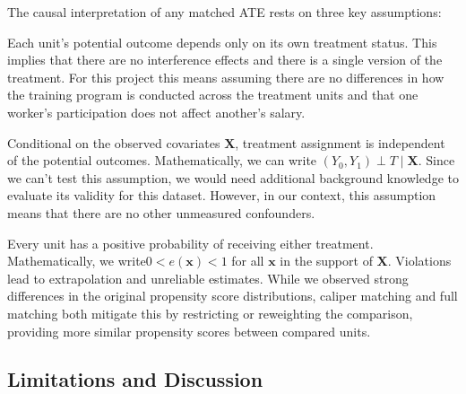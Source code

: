 \documentclass[12pt, a4paper]{article}
\begin{document}
The causal interpretation of any matched ATE rests on three key assumptions:

\begin{description}[leftmargin=2em, style=nextline]
  \item[SUTVA (Stable Unit Treatment Value Assumption)]
    Each unit's potential outcome depends only on its own treatment status. This implies that there are no interference effects and there is a single version of the treatment. For this project this means assuming there are no differences in how the training program is conducted across the treatment units and that one worker's participation does not affect another's salary.
  \item[Ignorability]
    Conditional on the observed covariates $\mathbf{X}$, treatment assignment is independent of the potential outcomes. Mathematically, we can write $(Y_0, Y_1) \perp T \mid \mathbf{X}$. Since we can't test this assumption, we would need additional background knowledge to evaluate its validity for this dataset. However, in our context, this assumption means that there are no other unmeasured confounders.
  \item[Overlap]
    Every unit has a positive probability of receiving either treatment. Mathematically, we write$0 < e(\mathbf{x}) < 1$ for all $\mathbf{x}$ in the support of $\mathbf{X}$. Violations lead to extrapolation and unreliable estimates. While we observed strong differences in the original propensity score distributions, caliper matching and full matching both mitigate this by restricting or reweighting the comparison, providing more similar propensity scores between compared units.
\end{description}

\subsection{Limitations and Discussion}
\end{document}
